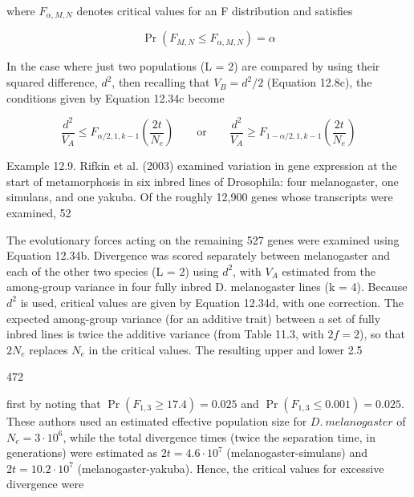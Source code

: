 \documentclass{article}
\begin{document}
where  $ F_{\alpha,M,N} $ denotes critical values for an F distribution and satisfies

\begin{equation}
\Pr\left(F_{M,N}\leq F_{\alpha,M,N}\right)=\alpha
\end{equation}

In the case where just two populations (L = 2) are compared by using their squared difference,  $ d^2 $, then recalling that  $ V_B = d^2/2 $ (Equation 12.8c), the conditions given by Equation 12.34c become

\begin{equation}
\frac{d^{2}}{V_{A}}\leq F_{\alpha/2,1,k-1}\left(\frac{2t}{N_{e}}\right)\qquad\mathrm{o r}\qquad\frac{d^{2}}{V_{A}}\geq F_{1-\alpha/2,1,k-1}\left(\frac{2t}{N_{e}}\right)
\tag{12.34d}
\label{eq:12_34d}
\end{equation}

Example 12.9. Rifkin et al. (2003) examined variation in gene expression at the start of metamorphosis in six inbred lines of Drosophila: four melanogaster, one simulans, and one yakuba. Of the roughly 12,900 genes whose transcripts were examined, 52%

The evolutionary forces acting on the remaining 527 genes were examined using Equation 12.34b. Divergence was scored separately between melanogaster and each of the other two species (L = 2) using  $ d^2 $, with  $ V_A $ estimated from the among-group variance in four fully inbred D. melanogaster lines (k = 4). Because  $ d^2 $ is used, critical values are given by Equation 12.34d, with one correction. The expected among-group variance (for an additive trait) between a set of fully inbred lines is twice the additive variance (from Table 11.3, with  $ 2f = 2 $), so that  $ 2N_e $ replaces  $ N_e $ in the critical values. The resulting upper and lower 2.5%

472

first by noting that  $ \Pr(F_{1,3} \geq 17.4) = 0.025 $ and  $ \Pr(F_{1,3} \leq 0.001) = 0.025 $. These authors used an estimated effective population size for  $ D.\ melanogaster $ of  $ N_e = 3 \cdot 10^6 $, while the total divergence times (twice the separation time, in generations) were estimated as  $ 2t = 4.6 \cdot 10^7 $ (melanogaster-simulans) and  $ 2t = 10.2 \cdot 10^7 $ (melanogaster-yakuba). Hence, the critical values for excessive divergence were
\end{document}
